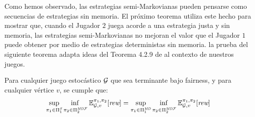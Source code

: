 %	
%	



Como hemos observado, las estrategias semi-Markovianas pueden pensarse como secuencias de estrategias sin memoria. El próximo teorema utiliza este hecho para mostrar que, cuando el Jugador $2$ juega acorde a una estrategia justa y sin memoria,  las estrategias semi-Markovianas no mejoran el valor que el Jugador $1$ puede obtener por medio de estrategias deterministas sin memoria. la prueba del siguiente teorema adapta ideas del Teorema 4.2.9 de \cite{FilarV96} al contexto de nuestros juegos.%

\begin{theorem}\label{th:semimarkov-to-detmemoryless} Para cualquier juego estocástico $\mathcal{G}$  que sea terminante bajo fairness, y para cualquier vértice $v$, se cumple que:
\[\adjustlimits
	\sup_{\strat{1} \in \SemiMarkovStrats{1}} \inf_{\strat{2} \in \DetMemorylessFairStrats{2}} \Expect{\strat{1}}{\strat{2}}_{\StochG,v}[\Rewards]
	= \adjustlimits
	\sup_{\strat{1} \in \DetMemorylessStrats{1}} \inf_{\strat{2} \in \DetMemorylessFairStrats{2}} \Expect{\strat{1}}{\strat{2}}_{\StochG,v}[\Rewards]
\]
\end{theorem}

